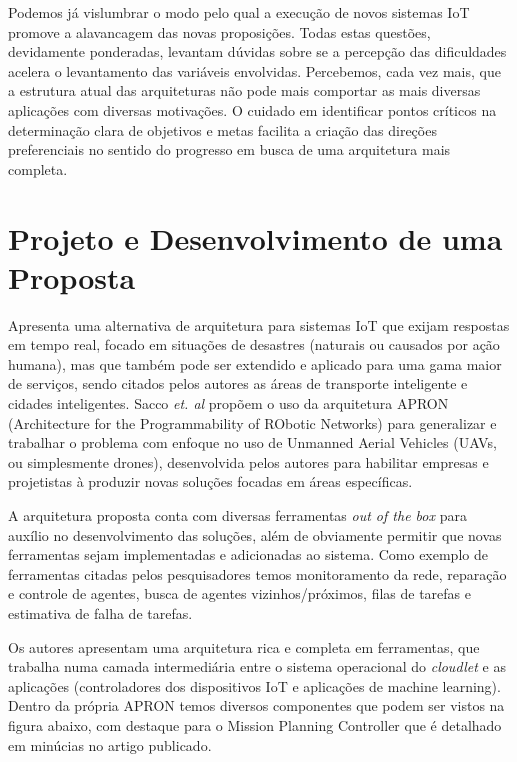 \documentclass[12pt]{article}
\begin{document}
Podemos já vislumbrar o modo pelo qual a execução de novos sistemas IoT promove a alavancagem das novas proposições. Todas estas questões, devidamente ponderadas, levantam dúvidas sobre se a percepção das dificuldades acelera o levantamento das variáveis envolvidas. Percebemos, cada vez mais, que a estrutura atual das arquiteturas não pode mais comportar as mais diversas aplicações com diversas motivações. O cuidado em identificar pontos críticos na determinação clara de objetivos e metas facilita a criação das direções preferenciais no sentido do progresso em busca de uma arquitetura mais completa.

\section{Projeto e Desenvolvimento de uma Proposta}

\cite{sacco} Apresenta uma alternativa de arquitetura para sistemas IoT que exijam respostas em tempo real, focado em situações de desastres (naturais ou causados por ação humana), mas que também pode ser extendido e aplicado para uma gama maior de serviços, sendo citados pelos autores as áreas de transporte inteligente e cidades inteligentes. Sacco \emph{et. al} propõem o uso da arquitetura APRON (Architecture for the Programmability of RObotic Networks) para generalizar e trabalhar o problema com enfoque no uso de Unmanned Aerial Vehicles (UAVs, ou simplesmente drones), desenvolvida pelos autores para habilitar empresas e projetistas à produzir novas soluções focadas em áreas específicas.

A arquitetura proposta conta com diversas ferramentas \emph{out of the box} para auxílio no desenvolvimento das soluções, além de obviamente permitir que novas ferramentas sejam implementadas e adicionadas ao sistema. Como exemplo de ferramentas citadas pelos pesquisadores temos monitoramento da rede, reparação e controle de agentes, busca de agentes vizinhos/próximos, filas de tarefas e estimativa de falha de tarefas.

Os autores apresentam uma arquitetura rica e completa em ferramentas, que trabalha numa camada intermediária entre o sistema operacional do \emph{cloudlet} e as aplicações (controladores dos dispositivos IoT e aplicações de machine learning). Dentro da própria APRON temos diversos componentes que podem ser vistos na figura abaixo, com destaque para o Mission Planning Controller que é detalhado em minúcias no artigo publicado.
\end{document}

